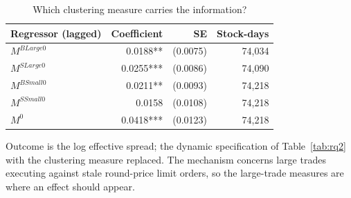 \begin{table}[htbp]
\centering
\caption{Which clustering measure carries the information?}
\label{tab:rq2alt}
\small
\begin{threeparttable}
\begin{tabular}{@{}lrrr@{}}
\toprule
Regressor (lagged) & Coefficient & SE & Stock-days \\
\midrule
$M^{BLarge0}$ & 0.0188** & (0.0075) & 74,034 \\
$M^{SLarge0}$ & 0.0255*** & (0.0086) & 74,090 \\
$M^{BSmall0}$ & 0.0211** & (0.0093) & 74,218 \\
$M^{SSmall0}$ & 0.0158 & (0.0108) & 74,218 \\
$M^{0}$ & 0.0418*** & (0.0123) & 74,218 \\
\bottomrule
\end{tabular}
\begin{tablenotes}[flushleft]\footnotesize
\item Outcome is the log effective spread; the dynamic specification of Table~\ref{tab:rq2} with the clustering measure replaced. The mechanism concerns large trades executing against stale round-price limit orders, so the large-trade measures are where an effect should appear.
\end{tablenotes}
\end{threeparttable}
\end{table}
